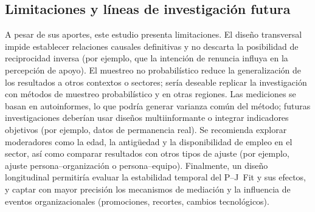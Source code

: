 \subsection{Limitaciones y líneas de investigación futura}

A pesar de sus aportes, este estudio presenta limitaciones. El diseño transversal impide establecer relaciones causales definitivas y no descarta la posibilidad de reciprocidad inversa (por ejemplo, que la intención de renuncia influya en la percepción de apoyo). El muestreo no probabilístico reduce la generalización de los resultados a otros contextos o sectores; sería deseable replicar la investigación con métodos de muestreo probabilístico y en otras regiones. Las mediciones se basan en autoinformes, lo que podría generar varianza común del método; futuras investigaciones deberían usar diseños multiinformante o integrar indicadores objetivos (por ejemplo, datos de permanencia real). Se recomienda explorar moderadores como la edad, la antigüedad y la disponibilidad de empleo en el sector, así como comparar resultados con otros tipos de ajuste (por ejemplo, ajuste persona–organización o persona–equipo). Finalmente, un diseño longitudinal permitiría evaluar la estabilidad temporal del P–J Fit y sus efectos, y captar con mayor precisión los mecanismos de mediación y la influencia de eventos organizacionales (promociones, recortes, cambios tecnológicos).



